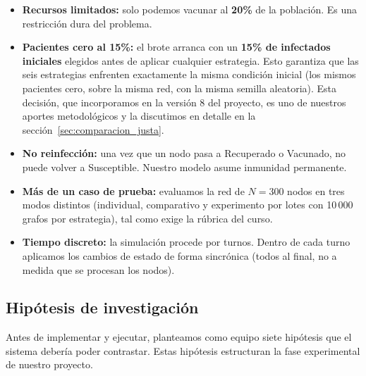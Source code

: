 \documentclass[spanish,notitlepage,letterpaper, 12pt]{article}
\begin{document}
\begin{itemize}[leftmargin=*]
    \item \textbf{Recursos limitados:} solo podemos vacunar al \textbf{20\%} de la poblaci\'on. Es una restricci\'on dura del problema.
    \item \textbf{Pacientes cero al 15\%:} el brote arranca con un \textbf{15\% de infectados iniciales} elegidos antes de aplicar cualquier estrategia. Esto garantiza que las seis estrategias enfrenten exactamente la misma condici\'on inicial (los mismos pacientes cero, sobre la misma red, con la misma semilla aleatoria). Esta decisi\'on, que incorporamos en la versi\'on 8 del proyecto, es uno de nuestros aportes metodol\'ogicos y la discutimos en detalle en la secci\'on~\ref{sec:comparacion_justa}.
    \item \textbf{No reinfecci\'on:} una vez que un nodo pasa a Recuperado o Vacunado, no puede volver a Susceptible. Nuestro modelo asume inmunidad permanente.
    \item \textbf{M\'as de un caso de prueba:} evaluamos la red de $N = 300$ nodos en tres modos distintos (individual, comparativo y experimento por lotes con 10\,000 grafos por estrategia), tal como exige la r\'ubrica del curso.
    \item \textbf{Tiempo discreto:} la simulaci\'on procede por turnos. Dentro de cada turno aplicamos los cambios de estado de forma sincr\'onica (todos al final, no a medida que se procesan los nodos).
\end{itemize}

\subsection{Hip\'otesis de investigaci\'on}

Antes de implementar y ejecutar, planteamos como equipo siete hip\'otesis que el sistema deber\'ia poder contrastar. Estas hip\'otesis estructuran la fase experimental de nuestro proyecto.
\end{document}
